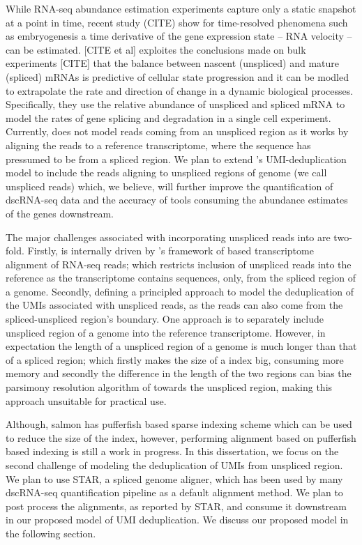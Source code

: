 While RNA-seq abundance estimation experiments capture only a static snapshot at a point in time, 
recent study (CITE) show for time-resolved phenomena such as embryogenesis a time derivative of 
the gene expression state -- RNA velocity -- can be estimated. [CITE et al] exploites the 
conclusions made on bulk experiments [CITE] that the balance between nascent (unspliced) and mature 
(spliced) mRNAs is predictive of cellular state progression and it can be modled to extrapolate the 
rate and direction of change in a dynamic biological processes. Specifically, they use the relative 
abundance of unspliced and spliced mRNA to model the rates of gene splicing and degradation in a
single cell experiment. Currently, \alevin does not model reads coming from an unspliced region as 
it works by aligning the reads to a reference transcriptome, where the sequence has pressumed to be 
from a spliced region. We plan to extend \alevin's UMI-deduplication model to include the reads 
aligning to unspliced regions of genome (we call unspliced reads) which, we believe, 
will further improve the quantification of dscRNA-seq data and the accuracy of tools consuming
the abundance estimates of the genes downstream.

The major challenges associated with incorporating unspliced reads into \alevin are two-fold.
Firstly, \alevin is internally driven by \salmon's framework of \rapmap based transcriptome 
alignment of RNA-seq reads; which restricts inclusion of unspliced reads into the reference 
as the transcriptome contains sequences, only, from the spliced region of a genome. 
Secondly, defining a principled approach to model the deduplication of the UMIs associated 
with unspliced reads, as the reads can also come from the spliced-unspliced region's boundary. 
One \naive approach is to separately include unspliced region of a genome into the reference 
transcriptome. However, in expectation the length of a unspliced region of a genome is much 
longer than that of a spliced region; which firstly makes the size of a \salmon index big, 
consuming more memory and secondly the difference in the length of the two regions can bias 
the parsimony resolution algorithm of \alevin towards the unspliced region, making this 
\naive approach unsuitable for practical use.

Although, salmon has pufferfish based sparse indexing scheme which can be used to reduce the 
size of the index, however, performing alignment based on pufferfish based indexing is 
still a work in progress. In this dissertation, we focus on the second challenge of modeling 
the deduplication of UMIs from unspliced region. We plan to use STAR, a spliced genome aligner, 
which has been used by many dscRNA-seq quantification pipeline as a default alignment method.
We plan to post process the alignments, as reported by STAR, and consume it downstream in
our proposed model of UMI deduplication. We discuss our proposed model in the following section.

